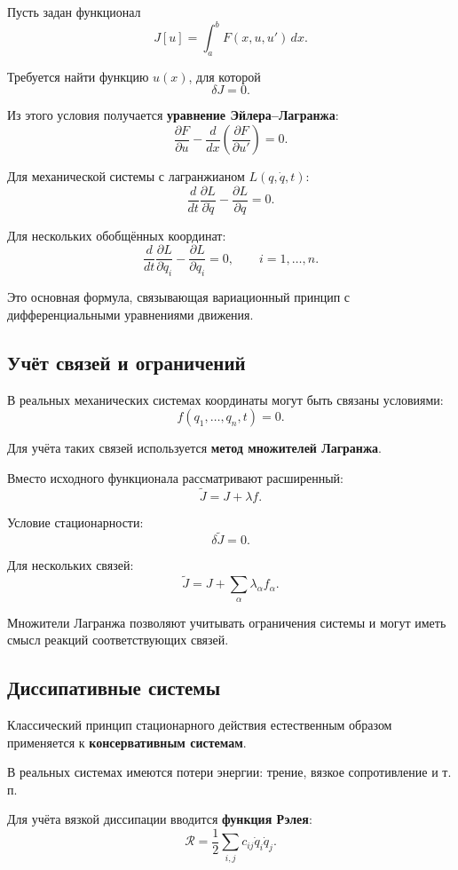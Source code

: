 Пусть задан функционал
\[
J[u]=\int_a^b F(x,u,u')\,dx.
\]

Требуется найти функцию $u(x)$, для которой
\[
\delta J=0.
\]

Из этого условия получается \textbf{уравнение Эйлера--Лагранжа}:
\[
\boxed{
	\frac{\partial F}{\partial u}
	-
	\frac{d}{dx}
	\left(
	\frac{\partial F}{\partial u'}
	\right)=0
}.
\]

Для механической системы с лагранжианом $L(q,\dot q,t)$:
\[
\boxed{
	\frac{d}{dt}
	\frac{\partial L}{\partial\dot q}
	-
	\frac{\partial L}{\partial q}=0
}.
\]

Для нескольких обобщённых координат:
\[
\boxed{
	\frac{d}{dt}
	\frac{\partial L}{\partial\dot q_i}
	-
	\frac{\partial L}{\partial q_i}=0,
	\qquad i=1,\ldots,n.
}
\]

Это основная формула, связывающая вариационный принцип
с дифференциальными уравнениями движения.

\subsection{Учёт связей и ограничений}

В реальных механических системах координаты могут быть связаны
условиями:
\[
f(q_1,\ldots,q_n,t)=0.
\]

Для учёта таких связей используется
\textbf{метод множителей Лагранжа}.

Вместо исходного функционала рассматривают расширенный:
\[
\boxed{
	\widetilde J=J+\lambda f
}.
\]

Условие стационарности:
\[
\delta\widetilde J=0.
\]

Для нескольких связей:
\[
\widetilde J
=
J+\sum_\alpha\lambda_\alpha f_\alpha.
\]

Множители Лагранжа позволяют учитывать ограничения системы
и могут иметь смысл реакций соответствующих связей.

\subsection{Диссипативные системы}

Классический принцип стационарного действия естественным образом
применяется к \textbf{консервативным системам}.

В реальных системах имеются потери энергии:
трение, вязкое сопротивление и т.\,п.

Для учёта вязкой диссипации вводится
\textbf{функция Рэлея}:
\[
\boxed{
	\mathcal R=
	\frac12\sum_{i,j}c_{ij}\dot q_i\dot q_j
}.
\]

